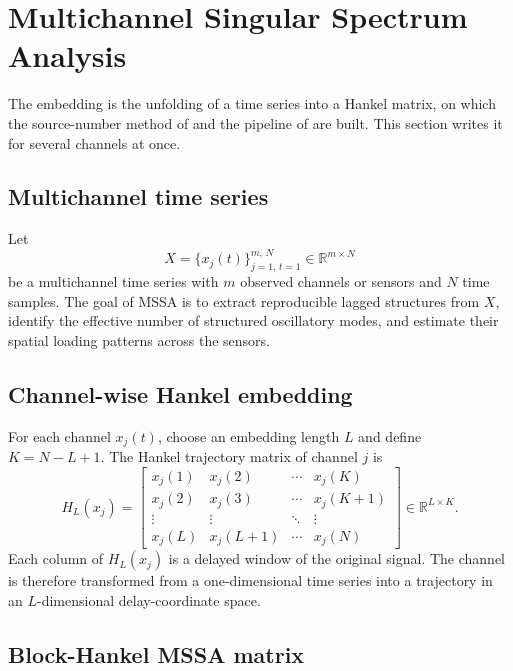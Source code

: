 \documentclass{article}
\begin{document}
\section{Multichannel Singular Spectrum Analysis}\label{sec:multichannel-singular-spectrum-analysis}

The embedding is the unfolding of a time series into a Hankel matrix, on which the source-number method of \cite{ref-BernadotteBuchstaber, ref-Bernadotte05} and the pipeline of \cite{ref-Bernadotte06} are built. This section writes it for several channels at once.

\subsection{Multichannel time series}\label{sec:multichannel-time-series}

Let \[
X = \{x_j(t)\}_{j=1,\,t=1}^{m,\,N} \in \mathbb{R}^{m \times N}
\] be a multichannel time series with $m$ observed channels or sensors and $N$ time samples. The goal of MSSA is to extract reproducible lagged structures from $X$, identify the effective number of structured oscillatory modes, and estimate their spatial loading patterns across the sensors.

\subsection{Channel-wise Hankel embedding}\label{sec:channel-wise-hankel-embedding}

For each channel $x_j(t)$, choose an embedding length $L$ and define $K = N - L + 1$. The Hankel trajectory matrix of channel $j$ is \[
H_L(x_j) =
\begin{bmatrix}
x_j(1) & x_j(2) & \cdots & x_j(K) \\
x_j(2) & x_j(3) & \cdots & x_j(K+1) \\
\vdots & \vdots & \ddots & \vdots \\
x_j(L) & x_j(L+1) & \cdots & x_j(N)
\end{bmatrix}
\in \mathbb{R}^{L \times K}.
\] Each column of $H_L(x_j)$ is a delayed window of the original signal. The channel is therefore transformed from a one-dimensional time series into a trajectory in an $L$-dimensional delay-coordinate space.

\subsection{Block-Hankel MSSA matrix}\label{sec:block-hankel-mssa-matrix}
\end{document}
